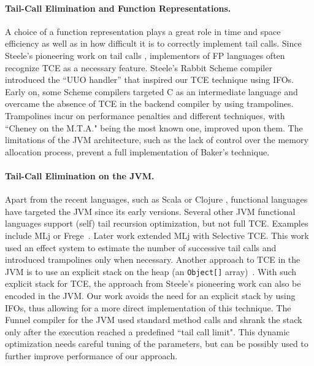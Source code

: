 \paragraph{Tail-Call Elimination and Function Representations.}
A choice of a function representation plays a great role
\cite{Shao1994} in time and space efficiency as well as in how
difficult it is to correctly implement tail calls. Since
Steele's pioneering work on tail calls \cite{Steele1977}, implementors
of FP languages often recognize TCE as a necessary
feature. Steele's Rabbit Scheme compiler~\cite{Steele1978} introduced the ``UUO handler'' 
that inspired our TCE technique using IFOs.
Early on, some Scheme compilers targeted C as an intermediate
language and overcame the absence of TCE in the backend compiler by
using trampolines. Trampolines incur on performance penalties and
different techniques, with ``Cheney on the M.T.A." \cite{Baker1995}
being the most known one, improved upon them. The limitations of the
JVM architecture, such as the lack of control over the memory
allocation process, prevent a full implementation of Baker's
technique. 

\paragraph{Tail-Call Elimination on the JVM.}
Apart from the recent languages, such as Scala \cite{Odersky2014b} or
Clojure \cite{Hickey2008}, functional languages have
targeted the JVM since its early versions. 
Several other JVM functional languages support (self) tail recursion
optimization, but not full TCE. Examples include MLj \cite{Benton1998}
or Frege~\cite{Wechsung}.  Later work \cite{Minamide2003} extended MLj
with Selective TCE. This work used an effect system to estimate the number
of successive tail calls and introduced trampolines only when
necessary. Another approach to TCE in the JVM  is to 
use an explicit stack on the heap (an \texttt{Object[]} array)~\cite{Choi2001}. 
With such explicit stack for TCE, the approach from Steele's pioneering work \cite{Steele1978} 
can also be encoded in the JVM. Our work avoids the need for an explicit stack by using 
IFOs, thus allowing for a more direct implementation of this technique. 
The Funnel compiler for the JVM \cite{Schinz2001} used
standard method calls and shrank the stack only after the execution
reached a predefined ``tail call limit". This dynamic optimization
needs careful tuning of the parameters, but can be possibly used to
further improve performance of our approach.

